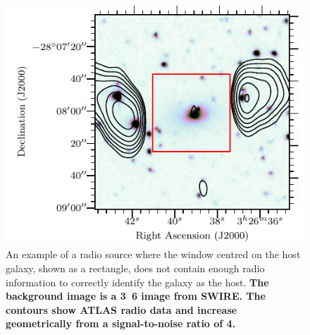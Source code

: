 \documentclass[fleqn,usenatbib,usedcolumn]{mnras}
\newcommand{\edited}[1]{{\bf {#1}}}
\begin{document}
        \begin{figure}
      \centering
      \includegraphics[width=\linewidth]{images/CI2363_fig.pdf}
      \caption{An example of a radio source where the window centred on the
        host galaxy, shown as a rectangle, does not contain enough radio
        information to correctly identify the galaxy as the host. \edited{The background image
        is a \unit{3.6}{\micro\meter} image from SWIRE. The contours show ATLAS radio
        data and increase geometrically from a signal-to-noise ratio of 4.}}
      \label{fig:broken-window-size}
    \end{figure}
\end{document}
